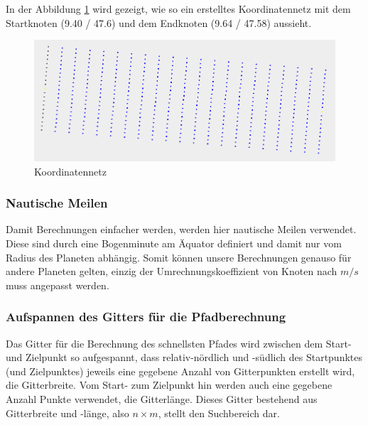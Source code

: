 In der Abbildung \ref{gridnet} wird gezeigt, wie so ein erstelltes Koordinatennetz mit dem Startknoten (9.40 / 47.6) und dem Endknoten (9.64 / 47.58) aussieht. 
\begin{figure}[h!]
\centering
\includegraphics[width=1\linewidth]{img/gridNet}
\caption{Koordinatennetz}
\label{gridnet}
\end{figure}

\subsubsection{Nautische Meilen} Damit Berechnungen einfacher werden, werden
hier nautische Meilen verwendet. Diese sind durch eine Bogenminute am Äquator
definiert und damit nur vom Radius des Planeten abhängig. Somit können unsere
Berechnungen genauso für andere Planeten gelten, einzig der
Umrechnungskoeffizient von Knoten nach $m/s$ muss angepasst werden.

\subsubsection{Aufspannen des Gitters für die Pfadberechnung} Das Gitter für die
Berechnung des schnellsten Pfades wird zwischen dem Start- und Zielpunkt so
aufgespannt, dass relativ-nördlich und -südlich des Startpunktes (und
Zielpunktes) jeweils eine gegebene Anzahl von Gitterpunkten erstellt wird, die
Gitterbreite. Vom Start- zum Zielpunkt hin werden auch eine gegebene Anzahl
Punkte verwendet, die Gitterlänge. Dieses Gitter bestehend aus Gitterbreite und
-länge, also $n\times m$, stellt den Suchbereich dar.

